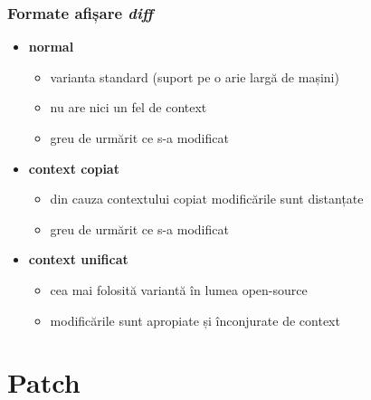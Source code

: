 \documentclass{beamer}
\begin{document}
\begin{frame}
  \frametitle{\textbf Formate afișare \textit{diff}}
  \begin{itemize}
  \item \textbf{normal}
    \begin{itemize}
    \item varianta standard (suport pe o arie largă de mașini)
    \item nu are nici un fel de context
    \item greu de urmărit ce s-a modificat
    \end{itemize}

  \item \textbf{context copiat}
    \begin{itemize}
    \item din cauza contextului copiat modificările sunt distanțate
    \item greu de urmărit ce s-a modificat
    \end{itemize}

  \item \textbf{context unificat}
    \begin{itemize}
    \item \alert{cea mai folosită variantă în lumea open-source}
    \item modificările sunt apropiate și înconjurate de context
    \end{itemize}
  \end{itemize}
\end{frame}



\section{Patch}
\frame{\tableofcontents[currentsection]}
\end{document}
